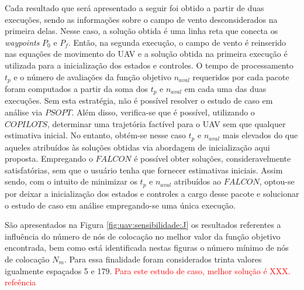 
Cada resultado que será apresentado a seguir foi obtido a partir de duas execuções, sendo as informações sobre o campo de vento desconsiderados na primeira delas. Nesse caso, a solução obtida é uma linha reta que conecta os \textit{waypoints} $ P_0 $ e $ P_f $. Então, na segunda execução, o campo de vento é reinserido nas equações de movimento do UAV e a solução obtida na primeira execução é utilizada para a inicialização dos estados e controles. O tempo de processamento $ t_p $ e o número de avaliações da função objetivo $ n_{aval} $ requeridos por cada pacote foram computados a partir da soma dos $ t_p $ e $ n_{aval} $ em cada uma das duas execuções. Sem esta estratégia,  não é possível resolver o estudo de caso em análise via $ PSOPT $. Além disso, verifica-se que é possível, utilizando o $ COPILOTS $, determinar uma trajetória factível para o UAV sem que qualquer estimativa inicial. No entanto, obtém-se nesse caso $ t_p $ e $ n_{aval} $ mais elevados do que aqueles atribuídos às soluções obtidas via abordagem de inicialização aqui proposta. Empregando o $ FALCON $ é possível obter soluções, consideravelmente satisfatórias, sem que o usuário tenha que fornecer estimativas iniciais. Assim sendo, com o intuito de minimizar os $ t_p $ e $ n_{aval} $ atribuídos ao $ FALCON $, optou-se por deixar a inicialização dos estados e controles a cargo desse pacote e solucionar o estudo de caso em análise empregando-se uma única execução. 


São apresentados na Figura \ref{fig:uav:sensibilidade:J} os resultados referentes a influência do número de nós de colocação no melhor valor da função objetivo encontrada, bem como está identificada nestas figuras o número mínimo de nós de colocação $ N_m $. Para essa finalidade foram considerados trinta valores igualmente espaçados 5 e 179. \textcolor{red}{Para este estudo de caso, melhor solução é XXX. refeência}


